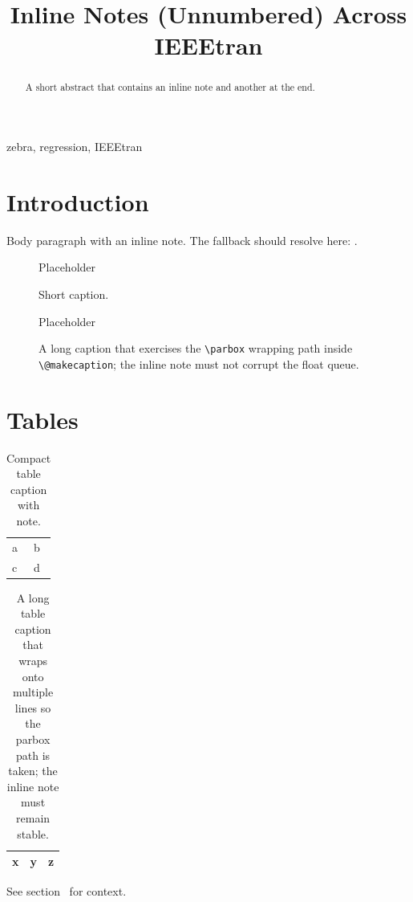 \documentclass[conference]{IEEEtran}
\begin{document}
\title{Inline Notes (Unnumbered) Across IEEEtran}
\author{}
\maketitle

\begin{abstract}
 A short abstract that contains an inline note
 and another at the end.
\end{abstract}

\begin{IEEEkeywords}
zebra, regression, IEEEtran
\end{IEEEkeywords}

\section{Introduction}
\label{sec:intro}
Body paragraph with an inline  note.
The fallback should resolve here: .
\lipsum[1][1-3]

\begin{figure}[t]
  \centering Placeholder
  \caption{Short caption.}
  \label{fig:short}
\end{figure}

\begin{figure}[t]
  \centering Placeholder
  \caption{A long caption that exercises the \texttt{\textbackslash parbox}
    wrapping path inside \texttt{\textbackslash @makecaption}; the inline
    note must not corrupt the float queue.}
  \label{fig:wide}
\end{figure}

\section{Tables}
\begin{table}[t]
  \centering
  \caption{Compact table caption with note.}
  \label{tab:compact}
  \begin{tabular}{ll}\hline a & b \\ c & d \\\hline\end{tabular}
\end{table}

\begin{table}[t]
  \centering
  \caption{A long table caption that wraps onto multiple lines so the
    parbox path is taken; the inline note must remain stable.}
  \label{tab:wide}
  \begin{tabular}{lll}\hline x & y & z \\\hline\end{tabular}
\end{table}

\lipsum[2-3]

See section~ for context.
\end{document}
